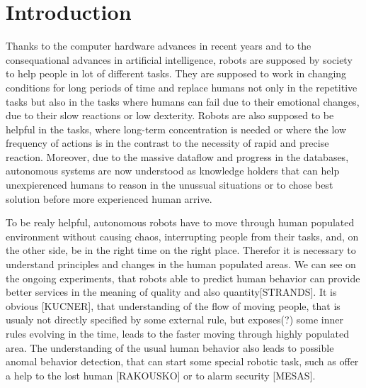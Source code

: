 \section{Introduction}

Thanks to the computer hardware advances in recent years and to the consequational advances in artificial intelligence, robots are supposed by society to help people in lot of different tasks.
They are supposed to work in changing conditions for long periods of time and replace humans not only in the repetitive tasks but also in the tasks where humans can fail due to their emotional changes, due to their slow reactions or low dexterity.
Robots are also supposed to be helpful in the tasks, where long-term concentration is needed or where the low frequency of actions is in the contrast to the necessity of rapid and precise reaction.  
Moreover, due to the massive dataflow and progress in the databases, autonomous systems are now understood as knowledge holders that can help unexpierenced humans to reason in the unussual situations or to chose best solution before more experienced human arrive.

To be realy helpful, autonomous robots have to move through human populated environment without causing chaos, interrupting people from their tasks, and, on the other side, be in the right time on the right place.
Therefor it is necessary to understand principles and changes in the human populated areas.
We can see on the ongoing experiments, that robots able to predict human behavior can provide better services in the meaning of quality and also quantity[STRANDS].
It is obvious [KUCNER], that understanding of the flow of moving people, that is usualy not directly specified by some external rule, but exposes(?) some inner rules evolving in the time, leads to the faster moving through highly populated area.
The understanding of the usual human behavior also leads to possible anomal behavior detection, that can start some special robotic task, such as offer a help to the lost human [RAKOUSKO] or to alarm security [MESAS].

